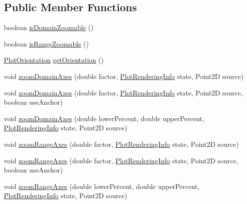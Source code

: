 \subsection*{Public Member Functions}
\begin{DoxyCompactItemize}
\item 
boolean \mbox{\hyperlink{interfaceorg_1_1jfree_1_1chart_1_1plot_1_1_zoomable_a7c10a2f8573d8238ce31a4ee8d7dd2db}{is\+Domain\+Zoomable}} ()
\item 
boolean \mbox{\hyperlink{interfaceorg_1_1jfree_1_1chart_1_1plot_1_1_zoomable_aee592b4d6f620a0571974e29247a66b1}{is\+Range\+Zoomable}} ()
\item 
\mbox{\hyperlink{classorg_1_1jfree_1_1chart_1_1plot_1_1_plot_orientation}{Plot\+Orientation}} \mbox{\hyperlink{interfaceorg_1_1jfree_1_1chart_1_1plot_1_1_zoomable_a293ef8fc796608bde4d44dfbac8dfdda}{get\+Orientation}} ()
\item 
void \mbox{\hyperlink{interfaceorg_1_1jfree_1_1chart_1_1plot_1_1_zoomable_abad274f3727b5d7498e9109ed0e9fdb2}{zoom\+Domain\+Axes}} (double factor, \mbox{\hyperlink{classorg_1_1jfree_1_1chart_1_1plot_1_1_plot_rendering_info}{Plot\+Rendering\+Info}} state, Point2D source)
\item 
void \mbox{\hyperlink{interfaceorg_1_1jfree_1_1chart_1_1plot_1_1_zoomable_a5afd53b5a39fea5a55293caf493ca011}{zoom\+Domain\+Axes}} (double factor, \mbox{\hyperlink{classorg_1_1jfree_1_1chart_1_1plot_1_1_plot_rendering_info}{Plot\+Rendering\+Info}} state, Point2D source, boolean use\+Anchor)
\item 
void \mbox{\hyperlink{interfaceorg_1_1jfree_1_1chart_1_1plot_1_1_zoomable_a01e9066d1cc850c7748ed7cb7c8e7f59}{zoom\+Domain\+Axes}} (double lower\+Percent, double upper\+Percent, \mbox{\hyperlink{classorg_1_1jfree_1_1chart_1_1plot_1_1_plot_rendering_info}{Plot\+Rendering\+Info}} state, Point2D source)
\item 
void \mbox{\hyperlink{interfaceorg_1_1jfree_1_1chart_1_1plot_1_1_zoomable_a906118396b0cc076e43cc7c072a3842c}{zoom\+Range\+Axes}} (double factor, \mbox{\hyperlink{classorg_1_1jfree_1_1chart_1_1plot_1_1_plot_rendering_info}{Plot\+Rendering\+Info}} state, Point2D source)
\item 
void \mbox{\hyperlink{interfaceorg_1_1jfree_1_1chart_1_1plot_1_1_zoomable_a0880fd64ad82feb1ba1a3a2b1b6e5541}{zoom\+Range\+Axes}} (double factor, \mbox{\hyperlink{classorg_1_1jfree_1_1chart_1_1plot_1_1_plot_rendering_info}{Plot\+Rendering\+Info}} state, Point2D source, boolean use\+Anchor)
\item 
void \mbox{\hyperlink{interfaceorg_1_1jfree_1_1chart_1_1plot_1_1_zoomable_a727d674650212288e299f6e32f498e07}{zoom\+Range\+Axes}} (double lower\+Percent, double upper\+Percent, \mbox{\hyperlink{classorg_1_1jfree_1_1chart_1_1plot_1_1_plot_rendering_info}{Plot\+Rendering\+Info}} state, Point2D source)
\end{DoxyCompactItemize}


